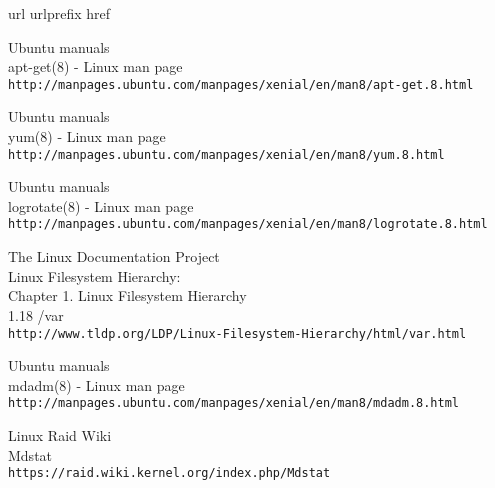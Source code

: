 \begin{thebibliography}{10}
\expandafter\ifx\csname url\endcsname\relax
  \def\url#1{\texttt{#1}}\fi
\expandafter\ifx\csname urlprefix\endcsname\relax\def\urlprefix{URL }\fi
\expandafter\ifx\csname href\endcsname\relax
  \def\href#1#2{#2} \def\path#1{#1}\fi

Ubuntu manuals\\
apt-get(8) - Linux man page\\
  \url{http://manpages.ubuntu.com/manpages/xenial/en/man8/apt-get.8.html}

Ubuntu manuals\\
yum(8) - Linux man page\\
  \url{http://manpages.ubuntu.com/manpages/xenial/en/man8/yum.8.html}

Ubuntu manuals\\
logrotate(8) - Linux man page\\
  \url{http://manpages.ubuntu.com/manpages/xenial/en/man8/logrotate.8.html}

The Linux Documentation Project\\
Linux Filesystem Hierarchy:\\
Chapter 1. Linux Filesystem Hierarchy\\
1.18 \slash var \\
  \url{http://www.tldp.org/LDP/Linux-Filesystem-Hierarchy/html/var.html}

Ubuntu manuals\\
mdadm(8) - Linux man page\\
  \url{http://manpages.ubuntu.com/manpages/xenial/en/man8/mdadm.8.html}

Linux Raid Wiki\\
Mdstat\\
  \url{https://raid.wiki.kernel.org/index.php/Mdstat}

\end{thebibliography}
